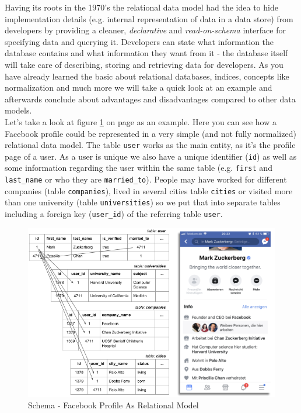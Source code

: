 {Having its roots in the 1970's the relational data model had the idea to hide implementation details (e.g. internal representation of data in a data store) from developers by providing a cleaner, \textit{declarative} and \textit{read-on-schema} interface for specifying data and querying it. Developers can state what information the database contains and what information they want from it - the database itself will take care of describing, storing and retrieving data for developers. As you have already learned the basic about relational databases, indices, concepts like normalization and much more we will take a quick look at an example and afterwards conclude about advantages and disadvantages compared to other data models. \\

Let's take a look at figure \ref{schema_facebook_relational_model} on page \pageref{schema_facebook_relational_model} as an example. Here you can see how a Facebook profile could be represented in a very simple (and not fully normalized) relational data model. 
The table \lstinline{user} works as the main entity, as it's the profile page of a user. As a user is unique we also have a unique identifier (\lstinline{id}) as well as some information regarding the user within the same table (e.g. \lstinline{first} and \lstinline{last_name} or who they are \lstinline{married_to}). 
People may have worked for different companies (table \lstinline{companies}), lived in several cities {table \lstinline{cities}} or visited more than one university (table \lstinline{universities}) so we put that into separate tables including a foreign key (\lstinline{user_id}) of the referring table {\lstinline{user}}.\\

\begin{figure}[ht]
	\centering
  \includegraphics[width=1\textwidth]{relational_model_zuckerberg.png}
	\caption{Schema - Facebook Profile As Relational Model}
	\label{schema_facebook_relational_model}
\end{figure}

}
